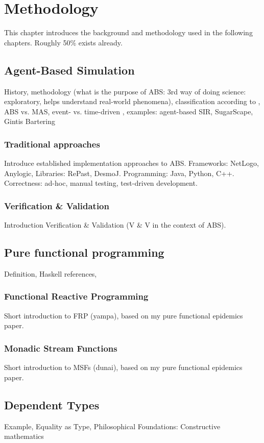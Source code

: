 \chapter{Methodology}
This chapter introduces the background and methodology used in the following chapters. Roughly 50\% exists already.

\section{Agent-Based Simulation}
History, methodology (what is the purpose of ABS: 3rd way of doing science: exploratory, helps understand real-world phenomena), classification according to \cite{macal_everything_2016}, ABS vs. MAS, event- vs. time-driven \cite{meyer_event-driven_2014}, examples: agent-based SIR, SugarScape, Gintis Bartering

\subsection{Traditional approaches}
Introduce established implementation approaches to ABS. Frameworks: NetLogo, Anylogic, Libraries: RePast, DesmoJ. Programming: Java, Python, C++. Correctness: ad-hoc, manual testing, test-driven development.

\subsection{Verification \& Validation}
Introduction Verification \& Validation (V \& V in the context of ABS).


\section{Pure functional programming}
Definition, Haskell references,

\subsection{Functional Reactive Programming}
Short introduction to FRP (yampa), based on my pure functional epidemics paper.

\subsection{Monadic Stream Functions}
Short introduction to MSFs (dunai), based on my pure functional epidemics paper.

\section{Dependent Types}
Example, Equality as Type, Philosophical Foundations: Constructive mathematics